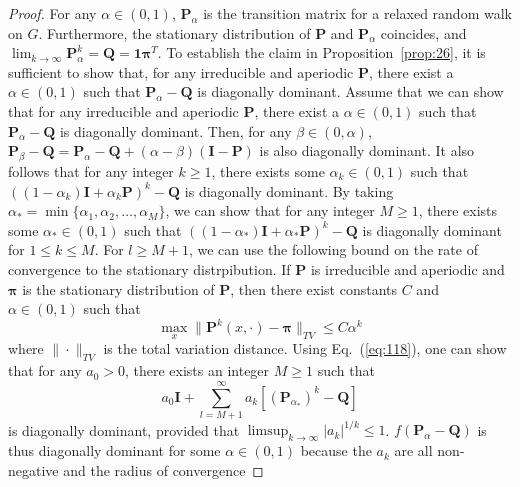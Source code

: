 \begin{proof}
  For any $\alpha \in (0,1)$, $\mathbf{P}_\alpha$ is the transition
  matrix for a relaxed random walk on $G$.  Furthermore, the
  stationary distribution of $\mathbf{P}$ and $\mathbf{P}_{\alpha}$
  coincides, and $\lim_{k \rightarrow \infty} \mathbf{P}_{\alpha}^{k}
  = \mathbf{Q} = \mathbf{1}\bm{\pi}^{T}$. To establish the claim in
  Proposition~\ref{prop:26}, it is sufficient to show that, for any
  irreducible and aperiodic $\mathbf{P}$, there exist a $\alpha \in
  (0,1)$ such that $\mathbf{P}_\alpha - \mathbf{Q}$ is diagonally
  dominant. Assume that we can show that for any irreducible and
  aperiodic $\mathbf{P}$, there exist a $\alpha \in (0,1)$ such that
  $\mathbf{P}_{\alpha} - \mathbf{Q}$ is diagonally dominant. Then, for
  any $\beta \in (0,\alpha)$, $\mathbf{P}_{\beta} - \mathbf{Q} =
  \mathbf{P}_{\alpha} - \mathbf{Q} + (\alpha - \beta)(\mathbf{I} -
  \mathbf{P})$ is also diagonally dominant. It also follows that for
  any integer $k \geq 1$, there exists some $\alpha_k \in (0,1)$ such
  that $((1 - \alpha_k)\mathbf{I} + \alpha_k\mathbf{P})^{k} -
  \mathbf{Q}$ is diagonally dominant. By taking $\alpha_* =
  \min\{\alpha_1, \alpha_2, \dots, \alpha_M\}$, we can show that for
  any integer $M \geq 1$, there exists some $\alpha_* \in (0,1)$ such
  that $((1 - \alpha_*)\mathbf{I} + \alpha_* \mathbf{P})^{k} -
  \mathbf{Q}$ is diagonally dominant for $1 \leq k \leq M$. For $l
  \geq M + 1$, we can use the following bound on the rate of
  convergence to the stationary distrpibution. If $\mathbf{P}$ is
  irreducible and aperiodic and $\bm{\pi}$ is the stationary
  distribution of $\mathbf{P}$, then there exist constants $C$ and
  $\alpha \in (0,1)$ such that
  \begin{equation} 
    \label{eq:118}
    \max_{x} \| \mathbf{P}^{k}(x,\cdot) - \bm{\pi} \|_{TV} \leq C
    \alpha^{k} 
  \end{equation}
  where $\| \cdot \|_{TV}$ is the total variation distance. Using
  Eq.~(\ref{eq:118}), one can show that for any $a_0 > 0$, there
  exists an integer $M \geq 1$ such
  that 
  \begin{equation} 
    \label{eq:119} 
    a_0 \mathbf{I} + \sum_{l = M +
      1}^{\infty} a_k[ (\mathbf{P}_{\alpha_*})^{k} -
    \mathbf{Q}] 
  \end{equation}
  is diagonally dominant, provided that $\limsup_{k \rightarrow
    \infty}{|a_k|^{1/k}} \leq 1$.  $f(\mathbf{P}_{\alpha} -
  \mathbf{Q})$ is thus diagonally dominant for some $\alpha \in (0,1)$
  because the $a_k$ are all non-negative and the radius of convergence

\end{proof}
